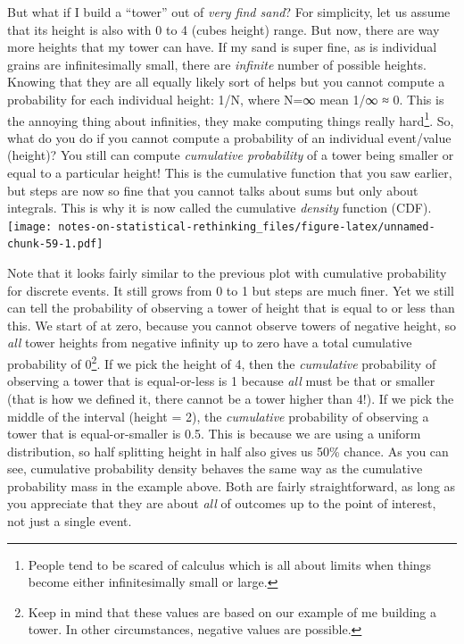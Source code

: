 \documentclass[
]{book}
\begin{document}
But what if I build a ``tower'' out of \emph{very find sand}? For simplicity, let us assume that its height is also with 0 to 4 (cubes height) range. But now, there are way more heights that my tower can have. If my sand is super fine, as is individual grains are infinitesimally small, there are \emph{infinite} number of possible heights. Knowing that they are all equally likely sort of helps but you cannot compute a probability for each individual height: 1/N, where N=∞ mean 1/∞ ≈ 0. This is the annoying thing about infinities, they make computing things really hard\footnote{People tend to be scared of calculus which is all about limits when things become either infinitesimally small or large.}. So, what do you do if you cannot compute a probability of an individual event/value (height)? You still can compute \emph{cumulative probability} of a tower being smaller or equal to a particular height! This is the cumulative function that you saw earlier, but steps are now so fine that you cannot talks about sums but only about integrals. This is why it is now called the cumulative \emph{density} function (CDF).
\texttt{[image: notes-on-statistical-rethinking\_files/figure-latex/unnamed-chunk-59-1.pdf]}

Note that it looks fairly similar to the previous plot with cumulative probability for discrete events. It still grows from 0 to 1 but steps are much finer. Yet we still can tell the probability of observing a tower of height that is equal to or less than this. We start of at zero, because you cannot observe towers of negative height, so \emph{all} tower heights from negative infinity up to zero have a total cumulative probability of 0\footnote{Keep in mind that these values are based on our example of me building a tower. In other circumstances, negative values are possible.}. If we pick the height of 4, then the \emph{cumulative} probability of observing a tower that is equal-or-less is 1 because \emph{all} must be that or smaller (that is how we defined it, there cannot be a tower higher than 4!). If we pick the middle of the interval (height = 2), the \emph{cumulative} probability of observing a tower that is equal-or-smaller is 0.5. This is because we are using a uniform distribution, so half splitting height in half also gives us 50\% chance. As you can see, cumulative probability density behaves the same way as the cumulative probability mass in the example above. Both are fairly straightforward, as long as you appreciate that they are about \emph{all} of outcomes up to the point of interest, not just a single event.
\end{document}
